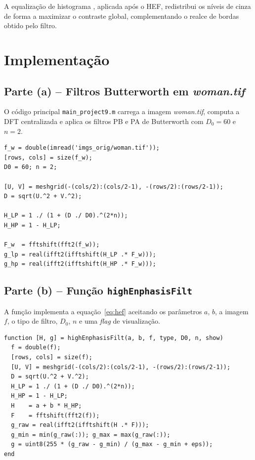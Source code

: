 \documentclass[12pt,a4paper,oneside,brazil,chapter=TITLE,section=TITLE]{abntex2}
\begin{document}
A equaliza\c{c}\~ao de histograma \cite{gonzalez2018}, aplicada ap\'os o HEF,
redistribui os n\'iveis de cinza de forma a maximizar o contraste global,
complementando o realce de bordas obtido pelo filtro.

\chapter{Implementa\c{c}\~ao}

\section{Parte (a) -- Filtros Butterworth em \textit{woman.tif}}

O c\'odigo principal \texttt{main\_project9.m} carrega a imagem
\textit{woman.tif}, computa a DFT centralizada e aplica os filtros
PB e PA de Butterworth com $D_0 = 60$ e $n = 2$.

\begin{lstlisting}[style=matlab, caption={Trecho principal -- Parte (a)}]
f_w = double(imread('imgs_orig/woman.tif'));
[rows, cols] = size(f_w);
D0 = 60; n = 2;

[U, V] = meshgrid(-(cols/2):(cols/2-1), -(rows/2):(rows/2-1));
D = sqrt(U.^2 + V.^2);

H_LP = 1 ./ (1 + (D ./ D0).^(2*n));
H_HP = 1 - H_LP;

F_w  = fftshift(fft2(f_w));
g_lp = real(ifft2(ifftshift(H_LP .* F_w)));
g_hp = real(ifft2(ifftshift(H_HP .* F_w)));
\end{lstlisting}

\section{Parte (b) -- Fun\c{c}\~ao \texttt{highEnphasisFilt}}

A fun\c{c}\~ao implementa a equa\c{c}\~ao~\eqref{eq:hef} aceitando os
par\^ametros $a$, $b$, a imagem $f$, o tipo de filtro, $D_0$, $n$ e uma
\textit{flag} de visualiza\c{c}\~ao.

\begin{lstlisting}[style=matlab,
  caption={highEnphasisFilt.m -- n\'ucleo do filtro}]
function [H, g] = highEnphasisFilt(a, b, f, type, D0, n, show)
  f = double(f);
  [rows, cols] = size(f);
  [U, V] = meshgrid(-(cols/2):(cols/2-1), -(rows/2):(rows/2-1));
  D = sqrt(U.^2 + V.^2);
  H_LP = 1 ./ (1 + (D ./ D0).^(2*n));
  H_HP = 1 - H_LP;
  H    = a + b * H_HP;
  F    = fftshift(fft2(f));
  g_raw = real(ifft2(ifftshift(H .* F)));
  g_min = min(g_raw(:)); g_max = max(g_raw(:));
  g = uint8(255 * (g_raw - g_min) / (g_max - g_min + eps));
end
\end{lstlisting}
\end{document}
